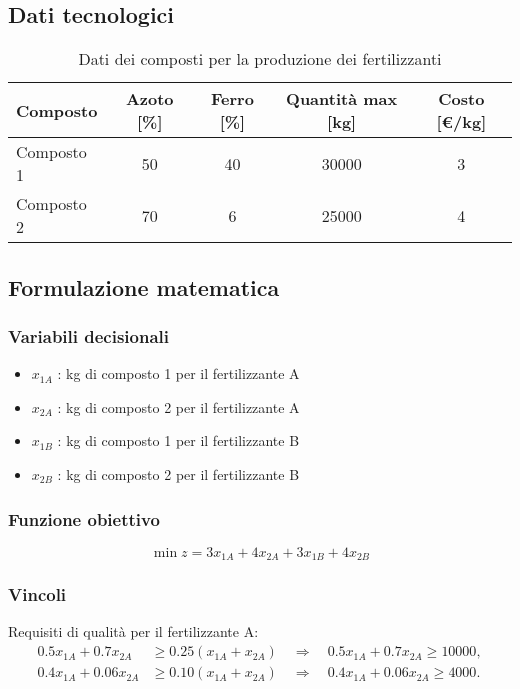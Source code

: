 \subsection{Dati tecnologici}
\begin{table}[h]
\centering
\begin{tabular}{|l|c|c|c|c|}
\hline
\textbf{Composto} & \textbf{Azoto [\%]} & \textbf{Ferro [\%]} & \textbf{Quantità max [kg]} & \textbf{Costo [€/kg]} \\
\hline
Composto 1       & 50                 & 40               & 30000                    & 3                    \\
\hline
Composto 2       & 70                 & 6                & 25000                    & 4                    \\
\hline
\end{tabular}
\caption{Dati dei composti per la produzione dei fertilizzanti}
\end{table}

\subsection{Formulazione matematica}

\subsubsection{Variabili decisionali}
\begin{itemize}
    \item $x_{1A}$ : kg di composto 1 per il fertilizzante A
    \item $x_{2A}$ : kg di composto 2 per il fertilizzante A
    \item $x_{1B}$ : kg di composto 1 per il fertilizzante B
    \item $x_{2B}$ : kg di composto 2 per il fertilizzante B
\end{itemize}

\subsubsection{Funzione obiettivo}
\[
\min z = 3x_{1A}+4x_{2A}+3x_{1B}+4x_{2B}
\]

\subsubsection{Vincoli}
Requisiti di qualità per il fertilizzante A:
\[
\begin{aligned}
0.5x_{1A}+0.7x_{2A} &\geq 0.25(x_{1A}+x_{2A})\quad\Rightarrow\quad 0.5x_{1A}+0.7x_{2A}\geq 10000, \\
0.4x_{1A}+0.06x_{2A} &\geq 0.10(x_{1A}+x_{2A})\quad\Rightarrow\quad 0.4x_{1A}+0.06x_{2A}\geq 4000.
\end{aligned}
\]

